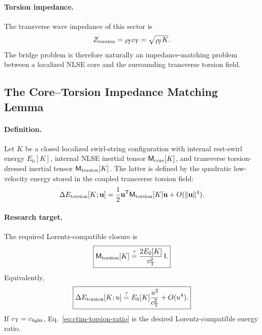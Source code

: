 \paragraph{Torsion impedance.}
The transverse wave impedance of this sector is
\begin{equation}
    Z_{\mathrm{torsion}}=\rho_{\!f}c_{\mathrm{T}}=\sqrt{\rho_{\!f} K}.
    \label{eq:ctim-ztorsion}
\end{equation}
The bridge problem is therefore naturally an impedance-matching problem between a localized NLSE core and the surrounding transverse torsion field.

\subsection{The Core--Torsion Impedance Matching Lemma}
\label{subsec:ctim-main-lemma}

\paragraph{Definition.}
Let \(K\) be a closed localized swirl-string configuration with internal rest-swirl energy \(E_0[K]\), internal NLSE inertial tensor \(\mathsf M_{\mathrm{core}}[K]\), and transverse torsion-dressed inertial tensor \(\mathsf M_{\mathrm{torsion}}[K]\).  The latter is defined by the quadratic low-velocity energy stored in the coupled transverse torsion field:
\begin{equation}
    \Delta E_{\mathrm{torsion}}[K;\mathbf u]
    =
    \frac12\mathbf u^{\mathsf T}
    \mathsf M_{\mathrm{torsion}}[K]
    \mathbf u
    +O(\lVert\mathbf u\rVert^4).
    \label{eq:ctim-torsion-inertia-definition}
\end{equation}

\paragraph{Research target.}
The required Lorentz-compatible closure is
\begin{equation}
    \boxed{
    \mathsf M_{\mathrm{torsion}}[K]
    \stackrel{?}{=}
    \frac{2E_0[K]}{c_{\mathrm{T}}^2}\,\mathsf I.
    }
    \label{eq:ctim-impedance-lemma}
\end{equation}
Equivalently,
\begin{equation}
    \boxed{
    \Delta E_{\mathrm{torsion}}[K;u]
    \stackrel{?}{=}
    E_0[K]\frac{u^2}{c_{\mathrm{T}}^2}
    +O(u^4).
    }
    \label{eq:ctim-torsion-ratio}
\end{equation}
If \(c_{\mathrm{T}}=c_{\mathrm{light}}\), Eq.~\eqref{eq:ctim-torsion-ratio} is the desired Lorentz-compatible energy ratio.

